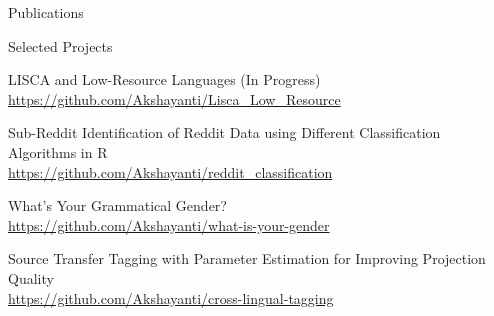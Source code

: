 \documentclass{resume}
\begin{document}
\begin{rSection}{Publications}

    {}

    {}

    {}
    
    \newpage
    {}

    {}

\end{rSection}



\begin{rSection}{Selected Projects}

    {LISCA and Low-Resource Languages (In Progress)}\\
        \url{https://github.com/Akshayanti/Lisca_Low_Resource}

    {Sub-Reddit Identification of Reddit Data using Different Classification Algorithms in R}\\
        \url{https://github.com/Akshayanti/reddit_classification}

    {What's Your Grammatical Gender?}\\
        \url{https://github.com/Akshayanti/what-is-your-gender}

    {Source Transfer Tagging with Parameter Estimation for Improving Projection Quality}\\
        \url{https://github.com/Akshayanti/cross-lingual-tagging}

\end{rSection}


\end{document}
